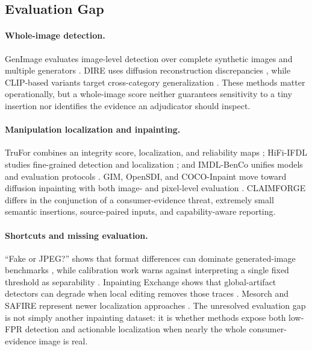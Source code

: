 \subsection{Evaluation Gap}

\paragraph{Whole-image detection.}
GenImage evaluates image-level detection over complete synthetic images and multiple generators \citep{zhu2023genimage}. DIRE uses diffusion reconstruction discrepancies \citep{wang2023dire}, while CLIP-based variants target cross-category generalization \citep{tan2024c2pclip}. These methods matter operationally, but a whole-image score neither guarantees sensitivity to a tiny insertion nor identifies the evidence an adjudicator should inspect.

\paragraph{Manipulation localization and inpainting.}
TruFor combines an integrity score, localization, and reliability maps \citep{guillaro2022trufor}; HiFi-IFDL studies fine-grained detection and localization \citep{guo2023hifi}; and IMDL-BenCo unifies models and evaluation protocols \citep{ma2024imdldbenco}. GIM, OpenSDI, and COCO-Inpaint move toward diffusion inpainting with both image- and pixel-level evaluation \citep{chen2024gim,wang2025opensdi,yan2025cocoinpaint}. CLAIMFORGE differs in the conjunction of a consumer-evidence threat, extremely small semantic insertions, source-paired inputs, and capability-aware reporting.

\paragraph{Shortcuts and missing evaluation.}
``Fake or JPEG?'' shows that format differences can dominate generated-image benchmarks \citep{grommelt2024fakejpeg}, while calibration work warns against interpreting a single fixed threshold as separability \citep{yang2026calibration}. Inpainting Exchange shows that global-artifact detectors can degrade when local editing removes those traces \citep{nebioglu2026inpaintingexchange}. Mesorch and SAFIRE represent newer localization approaches \citep{zhu2024mesorch,kwon2024safire}. The unresolved evaluation gap is not simply another inpainting dataset: it is whether methods expose both low-FPR detection and actionable localization when nearly the whole consumer-evidence image is real.
